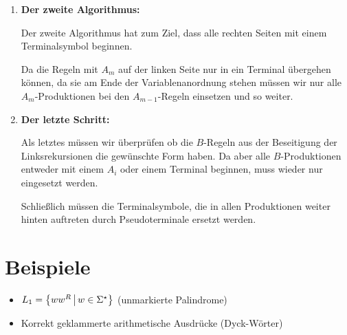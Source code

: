 \begin{enumerate}
	\item \textbf{Der zweite Algorithmus:}

	Der zweite Algorithmus hat zum Ziel, dass alle rechten Seiten mit einem Terminalsymbol beginnen.

	Da die Regeln mit $A_m$ auf der linken Seite nur in ein Terminal übergehen können, da sie am Ende der Variablenanordnung stehen müssen wir nur alle $A_m$-Produktionen bei den $A_{m-1}$-Regeln einsetzen und so weiter.

	\item \textbf{Der letzte Schritt:}

	Als letztes müssen wir überprüfen ob die $B$-Regeln aus der Beseitigung der Linksrekursionen die gewünschte Form haben.
	Da aber alle $B$-Produktionen entweder mit einem $A_i$ oder einem Terminal beginnen, muss wieder nur eingesetzt werden.

	Schließlich müssen die Terminalsymbole, die in allen Produktionen weiter hinten auftreten durch Pseudoterminale ersetzt werden.
\end{enumerate}

\section{Beispiele}
\begin{itemize}
	\item $L_1=\left\{ ww^R \,\middle|\, w\in\Sigma^\star \right\}$ (unmarkierte Palindrome)
	\item Korrekt geklammerte arithmetische Ausdrücke (Dyck-Wörter)
\end{itemize}
